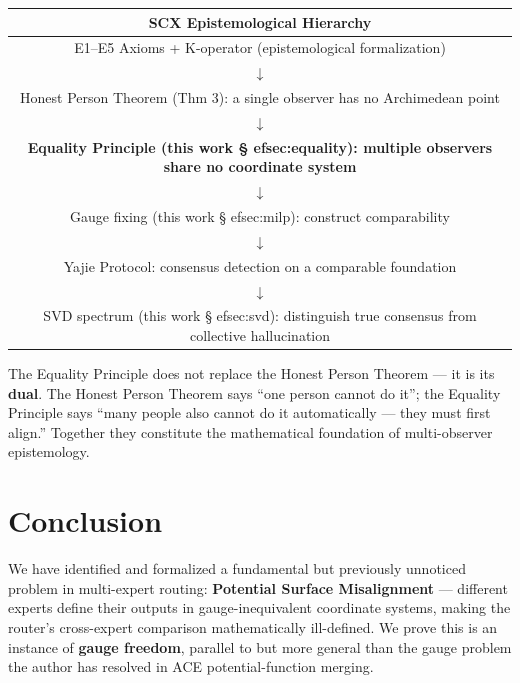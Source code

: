 \documentclass[12pt,a4paper]{article}
\theoremstyle{remark}
\begin{document}
\begin{center}
\begin{tabular}{c}
\toprule
\textbf{SCX Epistemological Hierarchy} \\
\midrule
E1--E5 Axioms + K-operator (epistemological formalization) \\
$\downarrow$ \\
Honest Person Theorem (Thm 3): a single observer has no Archimedean point \\
$\downarrow$ \\
\textbf{Equality Principle (this work \S
ef{sec:equality}): multiple observers share no coordinate system} \\
$\downarrow$ \\
Gauge fixing (this work \S
ef{sec:milp}): construct comparability \\
$\downarrow$ \\
Yajie Protocol: consensus detection on a comparable foundation \\
$\downarrow$ \\
SVD spectrum (this work \S
ef{sec:svd}): distinguish true consensus from collective hallucination \\
\bottomrule
\end{tabular}
\end{center}

The Equality Principle does not replace the Honest Person Theorem --- it is its \textbf{dual}. The Honest Person Theorem says ``one person cannot do it''; the Equality Principle says ``many people also cannot do it automatically --- they must first align.'' Together they constitute the mathematical foundation of multi-observer epistemology.

\section{Conclusion}
\label{sec:conclusion}

We have identified and formalized a fundamental but previously unnoticed problem in multi-expert routing: \textbf{Potential Surface Misalignment} --- different experts define their outputs in gauge-inequivalent coordinate systems, making the router's cross-expert comparison mathematically ill-defined. We prove this is an instance of \textbf{gauge freedom}, parallel to but more general than the gauge problem the author has resolved in ACE potential-function merging.
\end{document}
